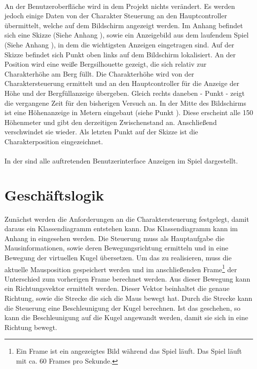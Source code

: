 \paragraph{}
An der Benutzeroberfläche wird in dem Projekt nichts verändert. Es werden jedoch einige Daten von der Charakter Steuerung an den Hauptcontroller übermittelt, welche auf dem Bildschirm angezeigt werden. Im Anhang befindet sich eine Skizze (Siehe Anhang ), sowie ein Anzeigebild aus dem laufendem Spiel (Siehe Anhang ), in dem die wichtigsten Anzeigen eingetragen sind. Auf der Skizze befindet sich Punkt  oben links auf dem Bildschirm lokalisiert. An der Position wird eine weiße Bergsilhouette gezeigt, die sich relativ zur Charakterhöhe am Berg füllt. Die Charakterhöhe wird von der Charaktersteuerung ermittelt und an den Hauptcontroller für die Anzeige der Höhe und der Bergfüllanzeige übergeben. Gleich rechts daneben - Punkt  - zeigt die vergangene Zeit für den bisherigen Versuch an. In der Mitte des Bildschirms ist eine Höhenanzeige in Metern eingebaut (siehe Punkt ). Diese erscheint alle 150 Höhenmeter und gibt den derzeitigen Zwischenstand an. Anschließend verschwindet sie wieder. Als letzten Punkt auf der Skizze ist die Charakterposition eingezeichnet.
\paragraph{}
In der  sind alle auftretenden Benutzerinterface Anzeigen im Spiel dargestellt.

\section{Geschäftslogik}
\paragraph{}
Zunächst werden die Anforderungen an die Charaktersteuerung festgelegt, damit daraus ein Klassendiagramm entstehen kann. Das Klassendiagramm kann im Anhang in  eingesehen werden. Die Steuerung muss als Hauptaufgabe die Mausinformationen, sowie deren Bewegungsrichtung ermitteln und in eine Bewegung der virtuellen Kugel übersetzen. Um das zu realisieren, muss die aktuelle Mausposition gespeichert werden und im anschließenden Frame\footnote{Ein Frame ist ein angezeigtes Bild während das Spiel läuft. Das Spiel läuft mit ca. 60 Frames pro Sekunde.} der Unterschied zum vorherigen Frame berechnet werden. Aus dieser Bewegung kann ein Richtungsvektor ermittelt werden. Dieser Vektor beinhaltet die genaue Richtung, sowie die Strecke die sich die Maus bewegt hat. Durch die Strecke kann die Steuerung eine Beschleunigung der Kugel berechnen. Ist das geschehen, so kann die Beschleunigung auf die Kugel angewandt werden, damit sie sich in eine Richtung bewegt.
